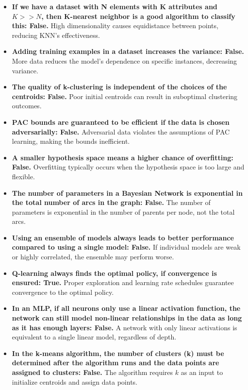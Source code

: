 \documentclass[10pt,a4paper]{article}
\begin{document}
\begin{itemize}
    \item \textbf{If we have a dataset with N elements with K attributes and $K >> N$, then K-nearest neighbor is a good algorithm to classify this: False.} High dimensionality causes equidistance between points, reducing KNN's effectiveness.

    \item \textbf{Adding training examples in a dataset increases the variance: False.} More data reduces the model's dependence on specific instances, decreasing variance.

    \item \textbf{The quality of k-clustering is independent of the choices of the centroids: False.} Poor initial centroids can result in suboptimal clustering outcomes.

    \item \textbf{PAC bounds are guaranteed to be efficient if the data is chosen adversarially: False.} Adversarial data violates the assumptions of PAC learning, making the bounds inefficient.

    \item \textbf{A smaller hypothesis space means a higher chance of overfitting: False.} Overfitting typically occurs when the hypothesis space is too large and flexible.

    \item \textbf{The number of parameters in a Bayesian Network is exponential in the total number of arcs in the graph: False.} The number of parameters is exponential in the number of parents per node, not the total arcs.

    \item \textbf{Using an ensemble of models always leads to better performance compared to using a single model: False.} If individual models are weak or highly correlated, the ensemble may perform worse.

    \item \textbf{Q-learning always finds the optimal policy, if convergence is ensured: True.} Proper exploration and learning rate schedules guarantee convergence to the optimal policy.

    \item \textbf{In an MLP, if all neurons only use a linear activation function, the network can still model non-linear relationships in the data as long as it has enough layers: False.} A network with only linear activations is equivalent to a single linear model, regardless of depth.

    \item \textbf{In the k-means algorithm, the number of clusters (k) must be determined after the algorithm runs and the data points are assigned to clusters: False.} The algorithm requires $k$ as an input to initialize centroids and assign data points.

\end{itemize}

\end{document}
